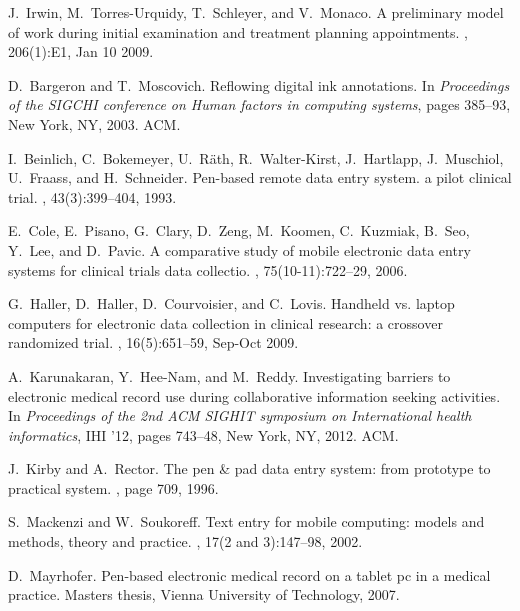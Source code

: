 \documentclass[11pt]{article}
\begin{document}
\begin{thebibliography}{9}

J.~Irwin, M.~Torres-Urquidy, T.~Schleyer, and V.~Monaco.
\newblock A preliminary model of work during initial examination and treatment
  planning appointments.
, 206(1):E1, Jan 10 2009.


D.~Bargeron and T.~Moscovich.
\newblock Reflowing digital ink annotations.
\newblock In {\em Proceedings of the SIGCHI conference on Human factors in
  computing systems}, pages 385--93, New York, NY, 2003. ACM.

I.~Beinlich, C.~Bokemeyer, U.~R{\"a}th, R.~Walter-Kirst, J.~Hartlapp,
  J.~Muschiol, U.~Fraass, and H.~Schneider.
\newblock Pen-based remote data entry system. a pilot clinical trial.
, 43(3):399--404, 1993.

E.~Cole, E.~Pisano, G.~Clary, D.~Zeng, M.~Koomen, C.~Kuzmiak, B.~Seo, Y.~Lee,
  and D.~Pavic.
\newblock A comparative study of mobile electronic data entry systems for
  clinical trials data collectio.
, 75(10-11):722--29, 2006.

G.~Haller, D.~Haller, D.~Courvoisier, and C.~Lovis.
\newblock Handheld vs. laptop computers for electronic data collection in
  clinical research: a crossover randomized trial.
, 16(5):651--59, Sep-Oct 2009.

A.~Karunakaran, Y.~Hee-Nam, and M.~Reddy.
\newblock Investigating barriers to electronic medical record use during
  collaborative information seeking activities.
\newblock In {\em Proceedings of the 2nd ACM SIGHIT symposium on International
  health informatics}, IHI '12, pages 743--48, New York, NY, 2012. ACM.

J.~Kirby and A.~Rector.
\newblock The pen \& pad data entry system: from prototype to practical system.
, page 709, 1996.

S.~Mackenzi and W.~Soukoreff.
\newblock Text entry for mobile computing: models and methods, theory and
  practice.
, 17(2 and 3):147--98, 2002.

D.~Mayrhofer.
\newblock Pen-based electronic medical record on a tablet pc in a medical
  practice.
\newblock Masters thesis, Vienna University of Technology, 2007.


\end{thebibliography}
\end{document}
